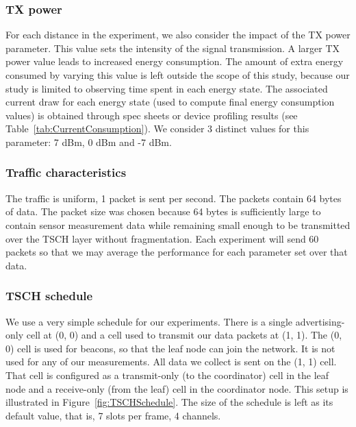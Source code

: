 \documentclass[conference]{IEEEtran}
\newcommand{\figref}[1]{Figure~\ref{#1}}
\newcommand{\tabref}[1]{Table~\ref{#1}}
\renewcommand\_{\textunderscore\allowbreak}
\begin{document}
\subsubsection{TX power}
\label{section:txpower}

For each distance in the experiment, we also consider the impact of the TX power parameter. This value sets the intensity of the signal transmission. A larger TX power value leads to increased energy consumption\cite{AccurateEnergyTSCH}. The amount of extra energy consumed by varying this value is left outside the scope of this study, because our study is limited to observing time spent in each energy state. The associated current draw for each energy state (used to compute final energy consumption values) is obtained through spec sheets or device profiling results (see \tabref{tab:CurrentConsumption}). We consider 3 distinct values for this parameter: 7 dBm, 0 dBm and -7 dBm. 


\subsubsection{Traffic characteristics}
\label{section:trafficchar}
The traffic is uniform, 1 packet is sent per second. The packets contain 64 bytes of data. The packet size was chosen because 64 bytes is sufficiently large to contain sensor measurement data while remaining small enough to be transmitted over the TSCH layer without fragmentation. Each experiment will send 60 packets so that we may average the performance for each parameter set over that data. 



\subsubsection{TSCH schedule}
\label{section:tschschedule}

We use a very simple schedule for our experiments. There is a single advertising-only cell at (0, 0) and a cell used to transmit our data packets at (1, 1). The (0, 0) cell is used for beacons, so that the leaf node can join the network. It is not used for any of our measurements. All data we collect is sent on the (1, 1) cell. That cell is configured as a transmit-only (to the coordinator) cell in the leaf node and a receive-only (from the leaf) cell in the coordinator node. This setup is illustrated in \figref{fig:TSCHSchedule}. The size of the schedule is left as its default value, that is, 7 slots per frame, 4 channels.
\end{document}

